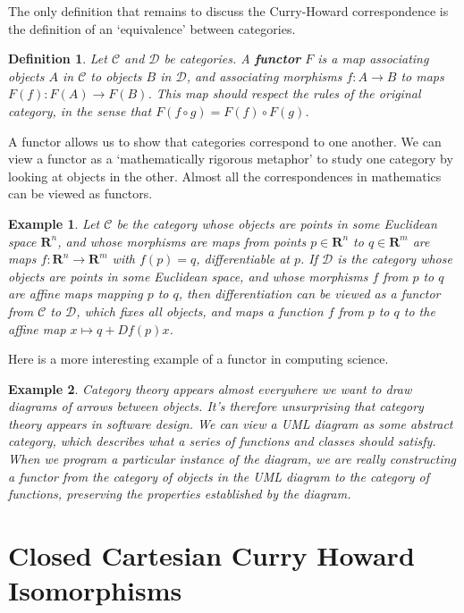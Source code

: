 \documentclass{article}
\theoremstyle{plain}
\newtheorem{definition}{Definition}
\newtheorem*{example}{Example}
\begin{document}
The only definition that remains to discuss the Curry-Howard correspondence is the definition of an `equivalence' between categories.

\begin{definition}
    Let $\mathcal{C}$ and $\mathcal{D}$ be categories. A {\bf functor} $F$ is a map associating objects $A$ in $\mathcal{C}$ to objects $B$ in $\mathcal{D}$, and associating morphisms $f: A \to B$ to maps $F(f): F(A) \to F(B)$. This map should respect the rules of the original category, in the sense that $F(f \circ g) = F(f) \circ F(g)$.
\end{definition}

A functor allows us to show that categories correspond to one another. We can view a functor as a `mathematically rigorous metaphor' to study one category by looking at objects in the other. Almost all the correspondences in mathematics can be viewed as functors.

\begin{example}
    Let $\mathcal{C}$ be the category whose objects are points in some Euclidean space $\mathbf{R}^n$, and whose morphisms are maps from points $p \in \mathbf{R}^n$ to $q \in \mathbf{R}^m$ are maps $f: \mathbf{R}^n \to \mathbf{R}^m$ with $f(p) = q$, differentiable at $p$. If $\mathcal{D}$ is the category whose objects are points in some Euclidean space, and whose morphisms $f$ from $p$ to $q$ are affine maps mapping $p$ to $q$, then differentiation can be viewed as a functor from $\mathcal{C}$ to $\mathcal{D}$, which fixes all objects, and maps a function $f$ from $p$ to $q$ to the affine map $x \mapsto q + Df(p)x$.
\end{example}

Here is a more interesting example of a functor in computing science.

\begin{example}
    Category theory appears almost everywhere we want to draw diagrams of arrows between objects. It's therefore unsurprising that category theory appears in software design. We can view a UML diagram as some abstract category, which describes what a series of functions and classes should satisfy. When we program a particular instance of the diagram, we are really constructing a functor from the category of objects in the UML diagram to the category of functions, preserving the properties established by the diagram.
\end{example}

\section{Closed Cartesian Curry Howard Isomorphisms}
\end{document}
